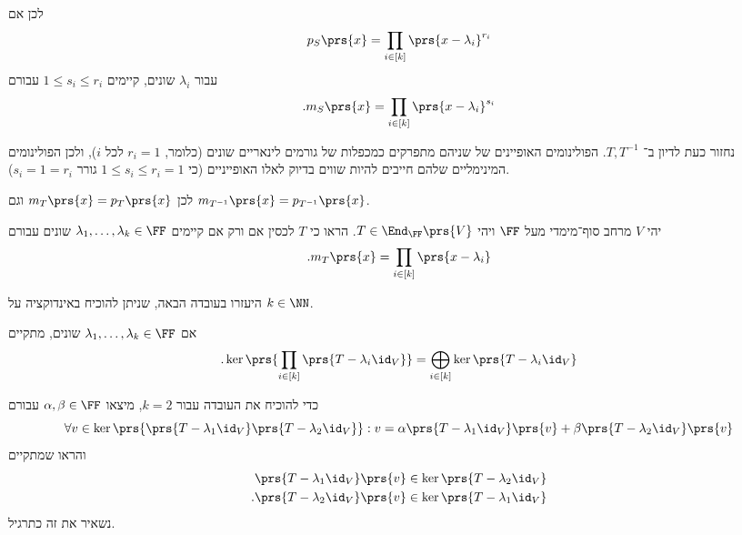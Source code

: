\documentclass[a4paper,10pt,twoside,openany]{book}
\begin{document}
\begin{solution}
\begin{enumerate}
לכן אם
\begin{align*}
p_S\prs{x} = \prod_{i \in [k]} \prs{x - \lambda_i}^{r_i}
\end{align*}
עבור
$\lambda_i$
שונים, קיימים
$1 \leq s_i \leq r_i$
עבורם
\begin{align*}
\text{.} m_S\prs{x} = \prod_{i \in [k]} \prs{x - \lambda_i}^{s_i}
\end{align*}

נחזור כעת לדיון ב־%
$T, T^{-1}$.
הפולינומים האופיינים של שניהם מתפרקים כמכפלות של גורמים לינאריים שונים (כלומר, $r_i = 1$ לכל $i$), ולכן הפולינומים המינימליים שלהם חייבים להיות שווים בדיוק לאלו האופייניים (כי
$1 \leq s_i \leq r_i = 1$
גורר
$s_i = 1 = r_i$).

לכן
$m_T\prs{x} = p_T\prs{x}$
וגם
$m_{T^{-1}}\prs{x} = p_{T^{-1}}\prs{x}$.
\end{enumerate}
\end{solution}

\begin{exercisechap}
יהי
$V$
מרחב סוף־מימדי מעל
$\FF$
ויהי
$T \in \End_\FF\prs{V}$.
הראו כי
$T$
לכסין
אם ורק אם קיימים
$\lambda_1, \ldots, \lambda_k \in \FF$
שונים עבורם
\begin{align*}
\text{.} m_T\prs{x} = \prod_{i \in [k]} \prs{x - \lambda_i}
\end{align*}

היעזרו בעובדה הבאה, שניתן להוכיח באינדוקציה על
$k \in \NN$.

אם
$\lambda_1, \ldots, \lambda_k \in \FF$
שונים, מתקיים
\begin{align*}
\text{.} \ker\prs{\prod_{i \in [k]} \prs{T - \lambda_i \id_V}} = \bigoplus_{i \in [k]} \ker\prs{T - \lambda_i \id_V}
\end{align*}

כדי להוכיח את העובדה עבור
$k=2$,
מיצאו
$\alpha, \beta \in \FF$
עבורם
\[\forall v \in \ker\prs{\prs{T - \lambda_1 \id_V} \prs{T - \lambda_2 \id_V}}: v = \alpha \prs{T - \lambda_1 \id_V}\prs{v} + \beta \prs{T - \lambda_2 \id_V}\prs{v}\]
והראו שמתקיים
\begin{align*}
\prs{T - \lambda_1 \id_V}\prs{v} &\in \ker\prs{T - \lambda_2 \id_V} \\
\text{.} \prs{T - \lambda_2 \id_V}\prs{v} &\in \ker\prs{T - \lambda_1 \id_V}
\end{align*}
נשאיר את זה כתרגיל.
\end{exercisechap}
\end{document}
